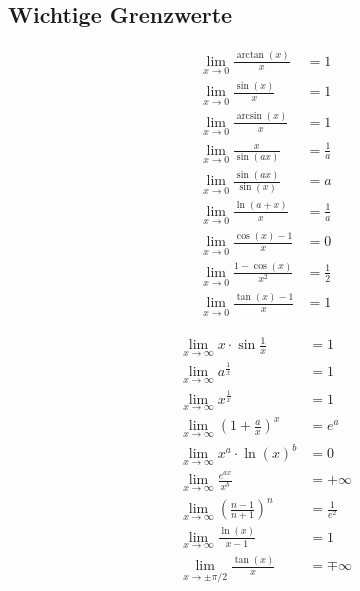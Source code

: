 \subsection{Wichtige Grenzwerte}
    \vspace*{-0.5em}
    \begin{minipage}{0.99\linewidth}
        \begin{minipage}{0.49\linewidth}
            \begin{align*}
                &\lim_{x \to 0} \frac{\arctan(x)}{x} &= 1\\
                &\lim_{x \to 0} \frac{\sin(x)}{x} &= 1\\
                &\lim_{x \to 0} \frac{\arcsin(x)}{x} &= 1\\
                &\lim_{x \to 0} \frac{x}{\sin(ax)} &= \frac{1}{a}\\
                &\lim_{x \to 0} \frac{\sin(ax)}{\sin(x)} &= a\\
                &\lim_{x \to 0} \frac{\ln(a+x)}{x} &= \frac{1}{a}\\
                &\lim_{x \to 0} \frac{\cos(x)-1}{x} &= 0\\
                &\lim_{x \to 0} \frac{1-\cos(x)}{x^2} &= \frac{1}{2}\\
                &\lim_{x \to 0} \frac{\tan(x)-1}{x} &= 1
            \end{align*}
        \end{minipage}
        \begin{minipage}{0.49\linewidth}
            \begin{align*}
                &\lim_{x \to \infty} x \cdot \sin{\frac{1}{x}} &= 1\\
                &\lim_{x \to \infty} a^{\frac{1}{x}} &= 1\\
                &\lim_{x \to \infty} x^{\frac{1}{x}} &= 1\\
                &\lim_{x \to \infty} \left(1+\frac{a}{x}\right)^x &= e^a\\
                &\lim_{x \to \infty} x^a \cdot \ln(x)^b &= 0\\
                &\lim_{x \to \infty} \frac{e^{ax}}{x^b} &= + \infty\\
                &\lim_{x \to \infty} \left(\frac{n-1}{n+1}\right)^n &= \frac{1}{e^2}\\
                &\lim_{x \to \infty} \frac{\ln(x)}{x-1} &= 1\\
                &\lim_{x \to \pm \pi/2} \frac{\tan(x)}{x} &= \mp \infty\\
            \end{align*}
        \end{minipage}
    \end{minipage}
    \vspace*{0.5em}